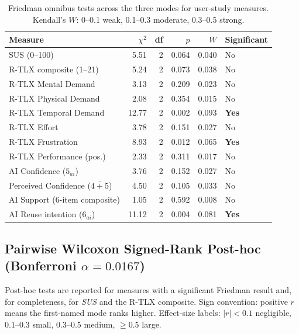 \begin{table}[H]
\centering
\caption{Friedman omnibus tests across the three modes for user-study measures.
Kendall's $W$: 0--0.1 weak, 0.1--0.3 moderate, 0.3--0.5 strong.}
\label{tab:app-survey-friedman}
\small
\begin{tabular}{@{}l r r r r l@{}}
\toprule
Measure & $\chi^2$ & df & $p$ & $W$ & Significant \\
\midrule
SUS (0--100)                    & 5.51  & 2 & 0.064  & 0.040 & No \\
R-TLX composite (1--21)         & 5.24  & 2 & 0.073  & 0.038 & No \\
R-TLX Mental Demand             & 3.13  & 2 & 0.209  & 0.023 & No \\
R-TLX Physical Demand           & 2.08  & 2 & 0.354  & 0.015 & No \\
R-TLX Temporal Demand           & 12.77 & 2 & 0.002  & 0.093 & \textbf{Yes} \\
R-TLX Effort                    & 3.78  & 2 & 0.151  & 0.027 & No \\
R-TLX Frustration               & 8.93  & 2 & 0.012  & 0.065 & \textbf{Yes} \\
R-TLX Performance (pos.)        & 2.33  & 2 & 0.311  & 0.017 & No \\
AI Confidence ($5_{ai}$)        & 3.76  & 2 & 0.152  & 0.027 & No \\
Perceived Confidence ($\overline{4{+}5}$) & 4.50  & 2 & 0.105  & 0.033 & No \\
AI Support (6-item composite)   & 1.05  & 2 & 0.592  & 0.008 & No \\
AI Reuse intention ($6_{ai}$)   & 11.12 & 2 & 0.004  & 0.081 & \textbf{Yes} \\
\bottomrule
\end{tabular}
\end{table}

\subsection{Pairwise Wilcoxon Signed-Rank Post-hoc (Bonferroni $\alpha = 0.0167$)}

Post-hoc tests are reported for measures with a significant Friedman result
and, for completeness, for \textit{SUS} and the R-TLX composite. Sign convention:
positive $r$ means the first-named mode ranks higher. Effect-size labels:
$|r| < 0.1$ negligible, $0.1$--$0.3$ small, $0.3$--$0.5$ medium, $\geq 0.5$ large.

